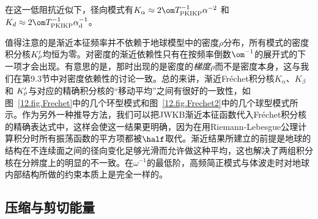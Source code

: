 在这一低阻抗近似下，径向模式有$K_{\alpha}\approx
2\om T_{\rm PKIKP}^{-1}\alpha^{-2}$ 和
$K_d\approx 2\om T_{\rm PKIKP}^{-1}\alpha_{\rm d}^{-1}$。

值得注意的是渐近本征频率并不依赖于地球模型中的密度$\rho$分布，所有模式的密度积分核$K_{\raisebox{0.3 ex}{\scriptsize$\rho$}}^{\prime}$均恒为零。对密度的渐近依赖性只有在按频率倒数$\om^{-1}$的展开式的下一项才会出现。有意思的是，那时出现的是密度的{\em 梯度\/}$\dot{\rho}$而不是密度本身，这与我们在第9.3节中对密度依赖性的讨论一致。总的来讲，渐近Fr\'{e}chet积分核$K_{\alpha}$、$K_{\beta}$和
$K_{\raisebox{0.3 ex}{\scriptsize$\rho$}}^{\prime}$与对应的精确积分核的“移动平均”之间有很好的一致性，如图~\ref{12.fig.Frechet}中的几个环型模式和图~\ref{12.fig.Frechet2}中的几个球型模式所示。作为另外一种推导方法，我们可以把JWKB渐近本征函数代入Fr\'{e}chet积分核的精确表达式中，这样会使这一结果更明确，因为在用Riemann-Lebesgue公理计算积分时所有振荡函数的平方项都被$\half$取代。渐近结果所建立的前提是地球的结构在不连续面之间的径向变化足够光滑而允许做这种平均，这也解决了两组积分核在分辨度上的明显的不一致。在$\omega^{-1}$的最低阶，高频简正模式与体波走时对地球内部结构所做的约束本质上是完全一样的。
%

\renewcommand{\thesubsection}{$\!\!\!\raise1.3ex\hbox{$\star$}\!\!$
\arabic{chapter}.\arabic{section}.\arabic{subsection}}
\subsection{压缩与剪切能量}
%
%
%
%
\renewcommand{\thesubsection}{\arabic{chapter}.\arabic{section}.\arabic{subsection}}

